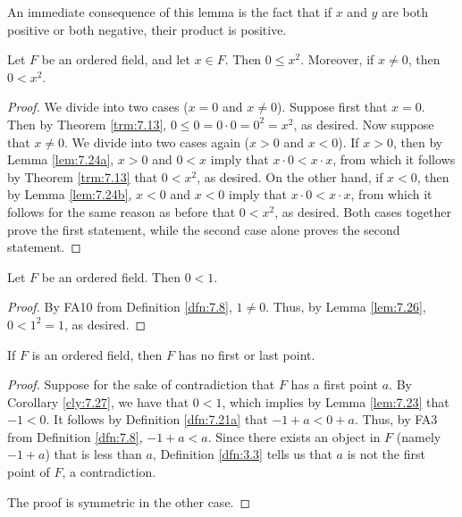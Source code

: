 \documentclass[../main.tex]{subfiles}
\begin{document}
\begin{remark}\label{rmk:7.25}
    An immediate consequence of this lemma is the fact that if $x$ and $y$ are both positive or both negative, their product is positive.
\end{remark}

\begin{lemma}\label{lem:7.26}
    Let $F$ be an ordered field, and let $x\in F$. Then $0\leq x^2$. Moreover, if $x\neq 0$, then $0<x^2$.
    \begin{proof}
        We divide into two cases ($x=0$ and $x\neq 0$). Suppose first that $x=0$. Then by Theorem \ref{trm:7.13}, $0\leq 0=0\cdot 0=0^2=x^2$, as desired. Now suppose that $x\neq 0$. We divide into two cases again ($x>0$ and $x<0$). If $x>0$, then by Lemma \ref{lem:7.24a}, $x>0$ and $0<x$ imply that $x\cdot 0<x\cdot x$, from which it follows by Theorem \ref{trm:7.13} that $0<x^2$, as desired. On the other hand, if $x<0$, then by Lemma \ref{lem:7.24b}, $x<0$ and $x<0$ imply that $x\cdot 0<x\cdot x$, from which it follows for the same reason as before that $0<x^2$, as desired. Both cases together prove the first statement, while the second case alone proves the second statement.
    \end{proof}
\end{lemma}

\begin{corollary}\label{cly:7.27}
    Let $F$ be an ordered field. Then $0<1$.
    \begin{proof}
        By FA10 from Definition \ref{dfn:7.8}, $1\neq 0$. Thus, by Lemma \ref{lem:7.26}, $0<1^2=1$, as desired.
    \end{proof}
\end{corollary}

\begin{theorem}\label{trm:7.28}
    If $F$ is an ordered field, then $F$ has no first or last point.
    \begin{proof}
        Suppose for the sake of contradiction that $F$ has a first point $a$. By Corollary \ref{cly:7.27}, we have that $0<1$, which implies by Lemma \ref{lem:7.23} that $-1<0$. It follows by Definition \ref{dfn:7.21a} that $-1+a<0+a$. Thus, by FA3 from Definition \ref{dfn:7.8}, $-1+a<a$. Since there exists an object in $F$ (namely $-1+a$) that is less than $a$, Definition \ref{dfn:3.3} tells us that $a$ is not the first point of $F$, a contradiction.\par
        The proof is symmetric in the other case.
    \end{proof}
\end{theorem}
\end{document}

